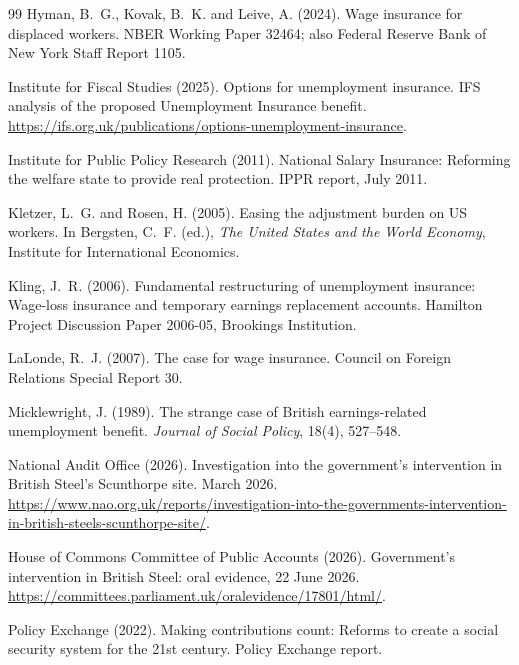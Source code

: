 \begin{thebibliography}{99}
Hyman, B.~G., Kovak, B.~K. and Leive, A. (2024).
\newblock Wage insurance for displaced workers.
\newblock NBER Working Paper 32464; also Federal Reserve Bank of New York Staff Report 1105.

Institute for Fiscal Studies (2025).
\newblock Options for unemployment insurance.
\newblock IFS analysis of the proposed Unemployment Insurance benefit. \url{https://ifs.org.uk/publications/options-unemployment-insurance}.

Institute for Public Policy Research (2011).
\newblock National Salary Insurance: Reforming the welfare state to provide real protection.
\newblock IPPR report, July 2011.

Kletzer, L.~G. and Rosen, H. (2005).
\newblock Easing the adjustment burden on US workers.
\newblock In Bergsten, C.~F. (ed.), \emph{The United States and the World Economy}, Institute for International Economics.

Kling, J.~R. (2006).
\newblock Fundamental restructuring of unemployment insurance: Wage-loss insurance and temporary earnings replacement accounts.
\newblock Hamilton Project Discussion Paper 2006-05, Brookings Institution.

LaLonde, R.~J. (2007).
\newblock The case for wage insurance.
\newblock Council on Foreign Relations Special Report 30.

Micklewright, J. (1989).
\newblock The strange case of British earnings-related unemployment benefit.
\newblock \emph{Journal of Social Policy}, 18(4), 527--548.

National Audit Office (2026).
\newblock Investigation into the government's intervention in British Steel's Scunthorpe site.
\newblock March 2026. \url{https://www.nao.org.uk/reports/investigation-into-the-governments-intervention-in-british-steels-scunthorpe-site/}.

House of Commons Committee of Public Accounts (2026).
\newblock Government's intervention in British Steel: oral evidence, 22 June 2026.
\newblock \url{https://committees.parliament.uk/oralevidence/17801/html/}.

Policy Exchange (2022).
\newblock Making contributions count: Reforms to create a social security system for the 21st century.
\newblock Policy Exchange report.


\end{thebibliography}
